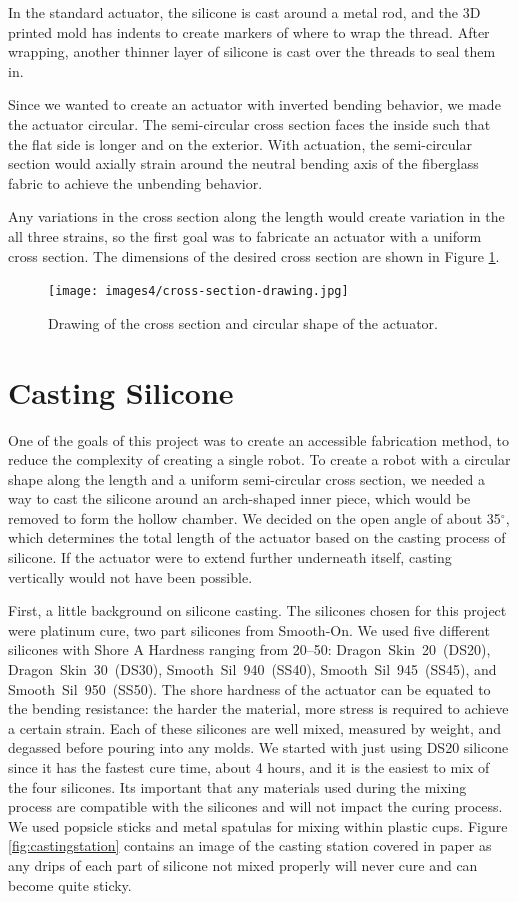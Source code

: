 In the standard actuator, the silicone is cast around a metal rod, and the 3D printed mold has indents to create markers of where to wrap the thread. After wrapping, another thinner layer of silicone is cast over the threads to seal them in. 

Since we wanted to create an actuator with inverted bending behavior, we made the actuator circular. The semi-circular cross section faces the inside such that the flat side is longer and on the exterior. With actuation, the semi-circular section would axially strain around the neutral bending axis of the fiberglass fabric to achieve the unbending behavior. 

Any variations in the cross section along the length would create variation in the all three strains, so the first goal was to fabricate an actuator with a uniform cross section. The dimensions of the desired cross section are shown in Figure \ref{fig:crosssection}.

\begin{figure}[h]
    \centering
    \texttt{[image: images4/cross-section-drawing.jpg]}
    \caption{Drawing of the cross section and circular shape of the actuator.}
    \label{fig:crosssection}
\end{figure}

\section{Casting Silicone}
One of the goals of this project was to create an accessible fabrication method, to reduce the complexity of creating a single robot. To create a robot with a circular shape along the length and a uniform semi-circular cross section, we needed a way to cast the silicone around an arch-shaped inner piece, which would be removed to form the hollow chamber. We decided on the open angle of about 35$^\circ$, which determines the total length of the actuator based on the casting process of silicone. If the actuator were to extend further underneath itself, casting vertically would not have been possible. 

First, a little background on silicone casting. The silicones chosen for this project were platinum cure, two part silicones from Smooth-On. We used five different silicones with Shore A Hardness ranging from 20--50: Dragon~Skin~20~(DS20), Dragon~Skin~30~(DS30), Smooth~Sil~940~(SS40), Smooth~Sil~945~(SS45), and Smooth~Sil~950~(SS50). The shore hardness of the actuator can be equated to the bending resistance: the harder the material, more stress is required to achieve a certain strain. Each of these silicones are well mixed, measured by weight, and degassed before pouring into any molds. We started with just using DS20 silicone since it has the fastest cure time, about 4 hours, and it is the easiest to mix of the four silicones. Its important that any materials used during the mixing process are compatible with the silicones and will not impact the curing process. We used popsicle sticks and metal spatulas for mixing within plastic cups. Figure \ref{fig:castingstation} contains an image of the casting station covered in paper as any drips of each part of silicone not mixed properly will never cure and can become quite sticky. 


